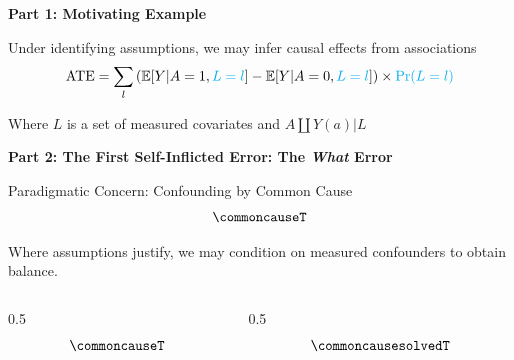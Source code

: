 \documentclass[
  ignorenonframetext,
  aspectratio=169,
]{beamer}
\begin{document}
\begin{frame}{\textbf{Part 1: Motivating Example}}
\begin{block}{Under identifying assumptions, we may infer causal effects
from associations}
\label{under-identifying-assumptions-we-may-infer-causal-effects-from-associations}
\[
\text{ATE} = \sum_{l} \left( \mathbb{E}[Y|A=1, \textcolor{cyan}{L=l}] - \mathbb{E}[Y|A=0, \textcolor{cyan}{L=l}] \right) \times \textcolor{cyan}{\Pr(L=l)}
\]

Where \(L\) is a set of measured covariates and \(A\coprod Y(a)|L\)
\end{block}
\end{frame}

\begin{frame}{\textbf{Part 2: The First Self-Inflicted Error: The
\emph{What} Error}}
\label{part-2-the-first-self-inflicted-error-the-what-error}
\begin{block}{Paradigmatic Concern: Confounding by Common Cause}
\label{paradigmatic-concern-confounding-by-common-cause}
\[\commoncauseT\]
\end{block}

\begin{block}{Where assumptions justify, we may condition on measured
confounders to obtain balance.}
\label{where-assumptions-justify-we-may-condition-on-measured-confounders-to-obtain-balance.}
\begin{columns}[T]
\begin{column}{0.5\linewidth}
\[
\commoncauseT
\]
\end{column}

\begin{column}{0.5\linewidth}
\[
\commoncausesolvedT
\]
\end{column}
\end{columns}
\end{block}
\end{frame}
\end{document}
